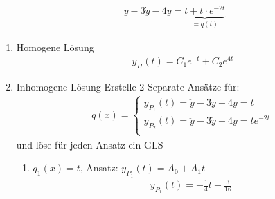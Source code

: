 \documentclass[a4paper]{article}
\begin{document}
\begin{multicols}{2}
					\begin{fmerke}
				\begin{align*}\ddot{y} - 3\dot{y} - 4y = \underbrace{t + t\cdot e^{-2t}}_{= q(t)}\end{align*}
			\begin{enumerate}
				\item Homogene Lösung
					\begin{align*}y_H(t) = C_1 e^{-t} + C_2 e^{4t}\end{align*}
				\item Inhomogene Lösung
						Erstelle 2 Separate Ansätze für:
						\begin{align*}q(x) = \begin{cases}
						y_{P_1}(t) = \ddot y - 3\dot y - 4y = t \\
						y_{P_2}(t) = \ddot y - 3\dot y - 4y = t e^{-2t}\\
						\end{cases}\end{align*} und löse für jeden Ansatz ein GLS
				\begin{enumerate} 
					\item $q_1(x) = t$, Ansatz: $y_{P_1}(t) = A_0 + A_1 t$
						\begin{align*}
							y_{P_1}(t) = -\frac{1}{4} t + \frac{3}{16}
						\end{align*}

\end{enumerate}
\end{enumerate}
\end{fmerke}
\end{multicols}
\end{document}
